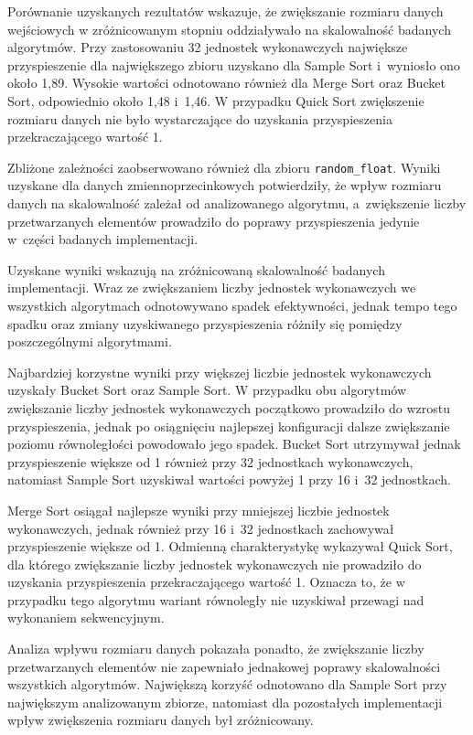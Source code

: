 Porównanie uzyskanych rezultatów wskazuje, że zwiększanie rozmiaru danych wejściowych w zróżnicowanym 
stopniu oddziaływało na skalowalność badanych algorytmów. 
Przy zastosowaniu 32 jednostek wykonawczych największe przyspieszenie dla największego zbioru uzyskano dla Sample Sort i~wyniosło ono około 1,89.
Wysokie wartości odnotowano również dla Merge Sort oraz Bucket Sort, odpowiednio około 1,48 i~1,46.
W przypadku Quick Sort zwiększenie rozmiaru danych nie było wystarczające do uzyskania przyspieszenia przekraczającego wartość 1.

Zbliżone zależności zaobserwowano również dla zbioru \texttt{random\_float}. 
Wyniki uzyskane dla danych zmiennoprzecinkowych potwierdziły, że wpływ rozmiaru danych na skalowalność zależał od analizowanego algorytmu, 
a~zwiększenie liczby przetwarzanych elementów prowadziło do poprawy przyspieszenia jedynie w~części badanych implementacji.

Uzyskane wyniki wskazują na zróżnicowaną skalowalność badanych implementacji. 
Wraz ze zwiększaniem liczby jednostek wykonawczych we wszystkich algorytmach odnotowywano spadek efektywności, 
jednak tempo tego spadku oraz zmiany uzyskiwanego przyspieszenia różniły się pomiędzy poszczególnymi algorytmami.

Najbardziej korzystne wyniki przy większej liczbie jednostek wykonawczych uzyskały Bucket Sort oraz Sample Sort. 
W przypadku obu algorytmów zwiększanie liczby jednostek wykonawczych początkowo prowadziło do wzrostu przyspieszenia, 
jednak po osiągnięciu najlepszej konfiguracji dalsze zwiększanie poziomu równoległości powodowało jego spadek. 
Bucket Sort utrzymywał jednak przyspieszenie większe od 1 również przy 32 jednostkach wykonawczych, 
natomiast Sample Sort uzyskiwał wartości powyżej 1 przy 16 i~32 jednostkach.

Merge Sort osiągał najlepsze wyniki przy mniejszej liczbie jednostek wykonawczych, 
jednak również przy 16 i~32 jednostkach zachowywał przyspieszenie większe od 1. 
Odmienną charakterystykę wykazywał Quick Sort, dla którego zwiększanie liczby jednostek wykonawczych 
nie prowadziło do uzyskania przyspieszenia przekraczającego wartość 1. 
Oznacza to, że w przypadku tego algorytmu wariant równoległy nie uzyskiwał przewagi nad wykonaniem sekwencyjnym.

Analiza wpływu rozmiaru danych pokazała ponadto, że zwiększanie liczby przetwarzanych elementów 
nie zapewniało jednakowej poprawy skalowalności wszystkich algorytmów.
Największą korzyść odnotowano dla Sample Sort przy największym analizowanym zbiorze,  
natomiast dla pozostałych implementacji wpływ zwiększenia rozmiaru danych był zróżnicowany.